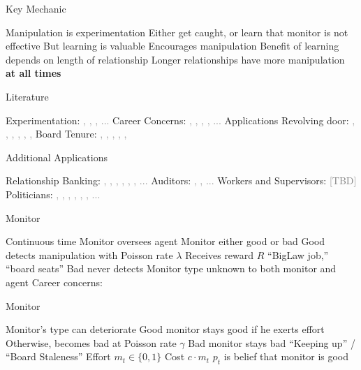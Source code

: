 \documentclass[usenames,dvipsnames]{beamer}
\newcommand{\bo}{\begin{outline}}
\newcommand{\eo}{\end{outline}}
\newcommand{\txg}[1]{\textcolor{gray}{#1}}
\newcommand{\txk}[1]{\textcolor{black}{#1}}
\begin{document}
\begin{frame}{Key Mechanic}
\bo
\1 Manipulation is experimentation
\1 Either get caught, or learn that monitor is not effective
\1 But learning is valuable
\1 Encourages manipulation 
\1 Benefit of learning depends on length of relationship
\1 Longer relationships have more manipulation \textbf{at all times}
\eo     
\end{frame}


\begin{frame}{Literature}
\bo
\1 Experimentation: \txg{\cite{bolton_strategic_1999}, \cite{keller_strategic_2005}, \txk{\cite{keller_breakdowns_2015}}, ...}
\1 Career Concerns: \txg{\cite{holmstrom_managerial_1999}, \txk{\cite{halac_managerial_2016}}, \cite{halac_experimenting_2018}, \cite{thomas_experimentation_2019}, ...}
\1 Applications
\2 Revolving door:  \txg{\cite{che_revolving_1995}, \cite{lucca_revolving_2014}, \cite{bond_labor_2014}, \cite{dehaan_revolving_2015}, \cite{cornaggia_revolving_2016}, \cite{kempf_job_2017}, \cite{lourie_revolving_2018} }
\2 Board Tenure: \txg{ \cite{bacon_corporate_1973}, \cite{vance_corporate_1983}, \cite{hermalin_determinants_1988}, \cite{vafeas_length_2003}, \cite{bonini_long-tenured_2017}, \cite{huang_zombie_2018} }
\eo
\end{frame}

\begin{frame}{Additional Applications}
\bo
\1 Relationship Banking: \txg{\cite{diamond_financial_1984}, \cite{rajan_insiders_1992},  \cite{petersen_benefits_1994}, \cite{petersen_effect_1995}, \cite{boot_can_2000}, \cite{parlour_loan_2008}, ... }
\1 Auditors:  \txg{ \cite{myers_exploring_2003}, \cite{gipper_economics_2017}, ...}
\1 Workers and Supervisors: \txg{[TBD]}
\1 Politicians: \txg{\cite{besley_does_1995}, \cite{maskin_politician_2004}, \cite{alesina_bureaucrats_2007},  \cite{dal_bo_term_2011}, \cite{kartik_reputation_2017}, \cite{sieg_estimating_2017}, ...}
\eo
\end{frame}

\begin{frame}{Monitor}
\bo
\1 Continuous time
\1 Monitor oversees agent
\1 Monitor either good or bad
\2 Good detects manipulation with Poisson rate $\lambda$
\2 Receives reward $R$
\3 ``BigLaw job,'' ``board seats''
\2 Bad never detects
\1 Monitor type unknown to both monitor and agent
\2 Career concerns: \cite{holmstrom_managerial_1999}

\eo
\end{frame}

\begin{frame}{Monitor}
\bo

\1 Monitor's type can deteriorate
\2 Good monitor stays good if he exerts effort 
\2 Otherwise, becomes bad at Poisson rate $\gamma$
\2 Bad monitor stays bad
\2 ``Keeping up'' / ``Board Staleness''
\1 Effort $m_t\in \{0,1\}$
\1 Cost $c \cdot m_t$
\1 $p_t$ is belief that monitor is good
\eo
\end{frame}
\end{document}
